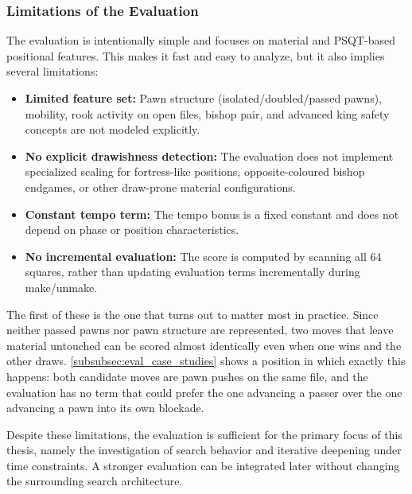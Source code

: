 \subsubsection{Limitations of the Evaluation}
\label{subsec:eval_limitations}

The evaluation is intentionally simple and focuses on material and PSQT-based
positional features. This makes it fast and easy to analyze, but it also implies
several limitations:
\begin{itemize}
    \item \textbf{Limited feature set:} Pawn structure (isolated/doubled/passed
    pawns), mobility, rook activity on open files, bishop pair, and advanced king
    safety concepts are not modeled explicitly.
    \item \textbf{No explicit drawishness detection:} The evaluation does not
    implement specialized scaling for fortress-like positions, opposite-coloured
    bishop endgames, or other draw-prone material configurations.
    \item \textbf{Constant tempo term:} The tempo bonus is a fixed constant and
    does not depend on phase or position characteristics.
    \item \textbf{No incremental evaluation:} The score is computed by scanning
    all 64 squares, rather than updating evaluation terms incrementally during
    make/unmake.
\end{itemize}

The first of these is the one that turns out to matter most in practice. Since
neither passed pawns nor pawn structure are represented, two moves that leave
material untouched can be scored almost identically even when one wins and the
other draws. \cref{subsubsec:eval_case_studies} shows a position in which exactly
this happens: both candidate moves are pawn pushes on the same file, and the
evaluation has no term that could prefer the one advancing a passer over the one
advancing a pawn into its own blockade.

Despite these limitations, the evaluation is sufficient for the primary focus of
this thesis, namely the investigation of search behavior and iterative deepening
under time constraints. A stronger evaluation can be integrated later without
changing the surrounding search architecture.
